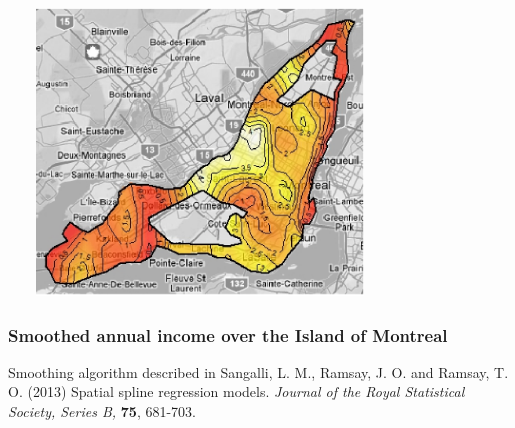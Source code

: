 \documentclass[11pt]{beamer}
\begin{document}
\begin{frame}

\begin{center}
\includegraphics[height=3in, width=4in]{figs/fig_Montreal_results_dirichlet_small_ter.eps}
\end{center}

\end{frame}


\begin{frame}

\frametitle{Smoothed annual income over the Island of Montreal}

Smoothing algorithm described in Sangalli, L. M., Ramsay, J. O. and Ramsay, T. O. (2013) Spatial spline regression models. \emph{Journal of the Royal Statistical Society, Series B,} {\bf 75}, 681-703.

\end{frame}
\end{document}
